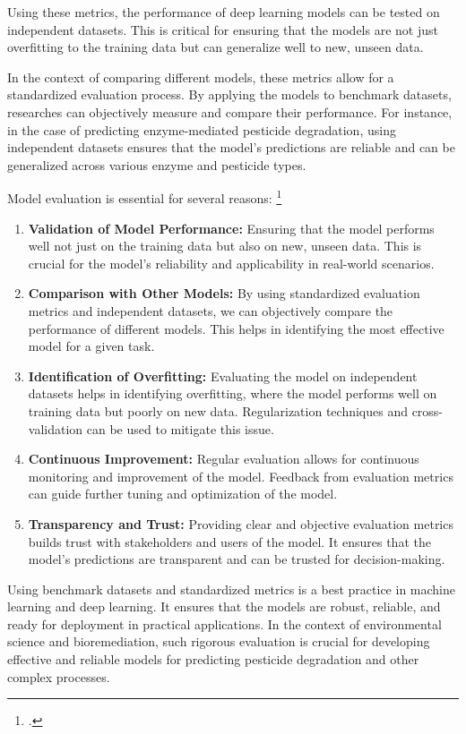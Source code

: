 Using these metrics, the performance of deep learning models can be tested on independent datasets. This is critical for ensuring that the models are not just overfitting to the training data but can generalize well to new, unseen data.

In the context of comparing different models, these metrics allow for a standardized evaluation process. By applying the models to benchmark datasets, researches can objectively measure and compare their performance. For instance, in the case of predicting enzyme-mediated pesticide degradation, using independent datasets ensures that the model’s predictions are reliable and can be generalized across various enzyme and pesticide types.

Model evaluation is essential for several reasons: \footcite{emmert-streibIntroductoryReviewDeep2020}

\begin{enumerate}
    \item \textbf{Validation of Model Performance:} Ensuring that the model performs well not just on the training data but also on new, unseen data. This is crucial for the model's reliability and applicability in real-world scenarios.
    \item \textbf{Comparison with Other Models:} By using standardized evaluation metrics and independent datasets, we can objectively compare the performance of different models. This helps in identifying the most effective model for a given task.
    \item \textbf{Identification of Overfitting:} Evaluating the model on independent datasets helps in identifying overfitting, where the model performs well on training data but poorly on new data. Regularization techniques and cross-validation can be used to mitigate this issue.
    \item \textbf{Continuous Improvement:} Regular evaluation allows for continuous monitoring and improvement of the model. Feedback from evaluation metrics can guide further tuning and optimization of the model.
    \item \textbf{Transparency and Trust:} Providing clear and objective evaluation metrics builds trust with stakeholders and users of the model. It ensures that the model’s predictions are transparent and can be trusted for decision-making.
\end{enumerate}

Using benchmark datasets and standardized metrics is a best practice in machine learning and deep learning. It ensures that the models are robust, reliable, and ready for deployment in practical applications. In the context of environmental science and bioremediation, such rigorous evaluation is crucial for developing effective and reliable models for predicting pesticide degradation and other complex processes.
